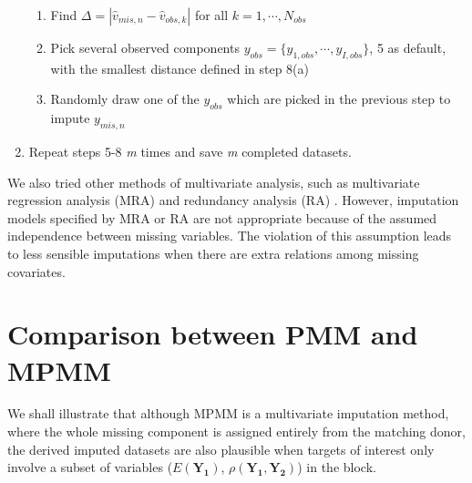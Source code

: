 \begin{enumerate}
		\begin{enumerate}
			\item Find $\Delta=|\hat{v}_{mis,n}-\hat{v}_{obs,k}|$ for all $k=1,\cdots,N_{obs}$
			\item Pick several observed components $y_{obs} = \{y_{1, obs},\cdots,y_{I, obs}\}$, 5 as default, with the smallest distance defined in step 8(a)
			\item Randomly draw one of the $y_{obs}$ which are picked in the previous step to impute $y_{mis,n}$ 
		\end{enumerate}
		\item Repeat steps 5-8 \emph{m} times and save \emph{m} completed datasets.
	\end{enumerate}
	
	We also tried other methods of multivariate analysis, such as multivariate regression analysis (MRA) \citep[chapter 10]{rencher2003methods} and redundancy analysis (RA) \citep{van1977redundancy}. However, imputation models specified by MRA or RA are not appropriate because of the assumed independence between missing variables. The violation of this assumption leads to less sensible imputations when there are extra relations among missing covariates. 
	
	\section{Comparison between PMM and MPMM}
	\label{sec:3.3}
	We shall illustrate that although MPMM is a multivariate imputation method, where the whole missing component is assigned entirely from the matching donor, the derived imputed datasets are also plausible when targets of interest only involve a subset of variables ($E(\boldsymbol{Y_{1}})$, $\rho(\boldsymbol{Y_{1}}, \boldsymbol{Y_{2}})$) in the block. 
	

